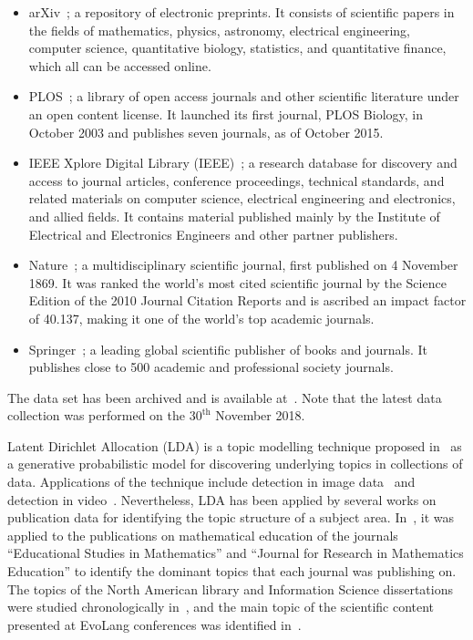 \begin{multicols}{2}
    \begin{itemize}
        \item arXiv~\cite{mckiernan2000}; a repository of electronic preprints.
        It consists of scientific
        papers in the fields of mathematics, physics, astronomy, electrical engineering,
        computer science, quantitative biology, statistics, and quantitative finance,
        which all can be accessed online.
        \item PLOS~\cite{plos}; a library of open access journals and other scientific literature
        under an open content license. It launched its first journal, PLOS Biology,
        in October 2003 and publishes seven journals, as of October 2015.
        \item IEEE Xplore Digital Library (IEEE)~\cite{ieee}; a research database for discovery
        and access to journal articles, conference proceedings, technical standards,
        and related materials on computer science, electrical engineering and electronics,
        and allied fields. It contains material published mainly by the Institute of
        Electrical and Electronics Engineers and other partner publishers. 
        \item Nature~\cite{nature}; a multidisciplinary scientific journal,
        first published on 4 November 1869. It was ranked the world's most cited
        scientific journal by the Science Edition of the 2010 Journal Citation Reports
        and is ascribed an impact factor of 40.137, making it one of the world's
        top academic journals.
        \item Springer~\cite{springer}; a leading global scientific publisher of
        books and journals. It publishes close to 500 academic and professional
        society journals.
    \end{itemize}
\end{multicols}

The data set has been archived and is available at~\cite{pd_data_2018}. Note that the latest data
collection was performed on the \(30^{\text{th}}\) November 2018.

Latent Dirichlet Allocation (LDA) is a topic modelling technique proposed
in~\cite{Blei2003} as a generative probabilistic model for discovering
underlying topics in collections of data.
Applications of the technique include detection in image data~\cite{Agarwal2008,
Coelho2010} and detection in video~\cite{Niebles2008, Wang2008}. Nevertheless,
LDA has been applied by several works on publication data for identifying the
topic structure of a subject area. In~\cite{Inglis2018}, it was applied to the
publications on mathematical education of the journals ``Educational Studies in
Mathematics'' and ``Journal for Research in Mathematics Education'' to
identify the dominant topics that each journal was publishing on. The topics of
the North American library and Information Science dissertations were 
studied chronologically in~\cite{Sugimoto2011}, and the main topic of the
scientific content presented at EvoLang conferences was identified
in~\cite{Bergmann2018}.




